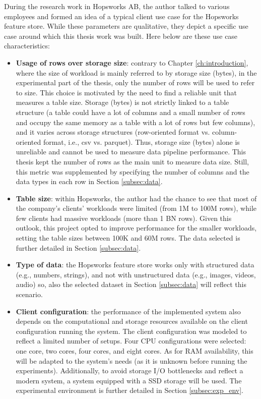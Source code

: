 During the research work in Hopsworks AB, the author talked to various employees and formed an idea of a typical client use case for the Hopsworks feature store. While these parameters are qualitative, they depict a specific use case around which this thesis work was built. Here below are these use case characteristics:
\begin{itemize}
  \item \textbf{Usage of rows over storage size}: contrary to Chapter \ref{ch:introduction}, where the size of workload is mainly referred to by storage size (bytes), in the experimental part of the thesis, only the number of rows will be used to refer to size. This choice is motivated by the need to find a reliable unit that measures a table size. Storage (bytes) is not strictly linked to a table structure (a table could have a lot of columns and a small number of rows and occupy the same memory as a table with a lot of rows but few columns), and it varies across storage structures (row-oriented format vs. column-oriented format, i.e., csv vs. parquet). Thus, storage size (bytes) alone is unreliable and cannot be used to measure data pipeline performance. This thesis kept the number of rows as the main unit to measure data size. Still, this metric was supplemented by specifying the number of columns and the data types in each row in Section \ref{subsec:data}.
  \item \textbf{Table size}: within Hopsworks, the author had the chance to see that most of the company's clients' workloads were limited (from 1M to 100M rows), while few clients had massive workloads (more than 1 BN rows). Given this outlook, this project opted to improve performance for the smaller workloads, setting the table sizes between 100K and 60M rows. The data selected is further detailed in Section \ref{subsec:data}.
  \item \textbf{Type of data}: the Hopsworks feature store works only with structured data (e.g., numbers, strings), and not with unstructured data (e.g., images, videos, audio) so, also the selected dataset in Section \ref{subsec:data} will reflect this scenario.
  \item \textbf{Client configuration}: the performance of the implemented system also depends on the computational and storage resources available on the client configuration running the system. The client configuration
  was modeled to reflect a limited number of setups. Four \gls{CPU} configurations were selected: one core, two cores, four cores, and eight cores. As for \gls{RAM} availability, this will be adapted to the system's needs (as it is unknown before running the experiments). Additionally, to avoid storage I/O bottlenecks and reflect a modern system, a system equipped with a \gls{SSD} storage will be used. The experimental environment is further detailed in Section \ref{subsec:exp_env}.
\end{itemize}

